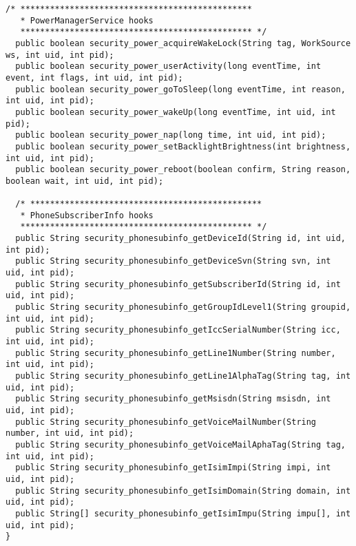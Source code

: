 \documentclass[letterpaper,twocolumn,10pt]{article}
\begin{document}
\begin{lstlisting}[emph={},basicstyle=\footnotesize,caption={Interface for Access Control Policy Modules}]
  /* ***********************************************
   * PowerManagerService hooks
   *********************************************** */
  public boolean security_power_acquireWakeLock(String tag, WorkSource ws, int uid, int pid);
  public boolean security_power_userActivity(long eventTime, int event, int flags, int uid, int pid);
  public boolean security_power_goToSleep(long eventTime, int reason, int uid, int pid);
  public boolean security_power_wakeUp(long eventTime, int uid, int pid);
  public boolean security_power_nap(long time, int uid, int pid);
  public boolean security_power_setBacklightBrightness(int brightness, int uid, int pid);
  public boolean security_power_reboot(boolean confirm, String reason, boolean wait, int uid, int pid);
  
  /* ***********************************************
   * PhoneSubscriberInfo hooks
   *********************************************** */
  public String security_phonesubinfo_getDeviceId(String id, int uid, int pid);
  public String security_phonesubinfo_getDeviceSvn(String svn, int uid, int pid);
  public String security_phonesubinfo_getSubscriberId(String id, int uid, int pid);
  public String security_phonesubinfo_getGroupIdLevel1(String groupid, int uid, int pid);
  public String security_phonesubinfo_getIccSerialNumber(String icc, int uid, int pid);
  public String security_phonesubinfo_getLine1Number(String number, int uid, int pid);
  public String security_phonesubinfo_getLine1AlphaTag(String tag, int uid, int pid);
  public String security_phonesubinfo_getMsisdn(String msisdn, int uid, int pid);
  public String security_phonesubinfo_getVoiceMailNumber(String number, int uid, int pid);
  public String security_phonesubinfo_getVoiceMailAphaTag(String tag, int uid, int pid);
  public String security_phonesubinfo_getIsimImpi(String impi, int uid, int pid);
  public String security_phonesubinfo_getIsimDomain(String domain, int uid, int pid);
  public String[] security_phonesubinfo_getIsimImpu(String impu[], int uid, int pid);
}
\end{lstlisting}
\end{document}
